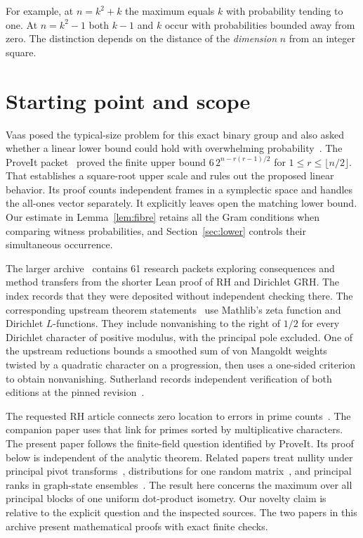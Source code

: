 \documentclass[11pt]{article}
\theoremstyle{remark}\newtheorem*{remark}{Remark}
\begin{document}
For example, at $n=k^2+k$ the maximum equals $k$ with probability tending to one. At $n=k^2-1$ both $k-1$ and $k$ occur with probabilities bounded away from zero. The distinction depends on the distance of the \emph{dimension} $n$ from an integer square.

\section{Starting point and scope}
Vaas posed the typical-size problem for this exact binary group and also asked whether a linear lower bound could hold with overwhelming probability~\cite{vaas}. The ProveIt packet~\cite{prev} proved the finite upper bound $6\,2^{n-r(r-1)/2}$ for $1\le r\le\lfloor n/2\rfloor$. That establishes a square-root upper scale and rules out the proposed linear behavior. Its proof counts independent frames in a symplectic space and handles the all-ones vector separately. It explicitly leaves open the matching lower bound. Our estimate in Lemma~\ref{lem:fibre} retains all the Gram conditions when comparing witness probabilities, and Section~\ref{sec:lower} controls their simultaneous occurrence.

The larger archive~\cite{catalog} contains 61 research packets exploring consequences and method transfers from the shorter Lean proof of RH and Dirichlet GRH. The index records that they were deposited without independent checking there. The corresponding upstream theorem statements~\cite{lean} use Mathlib's zeta function and Dirichlet $L$-functions. They include nonvanishing to the right of $1/2$ for every Dirichlet character of positive modulus, with the principal pole excluded. One of the upstream reductions bounds a smoothed sum of von Mangoldt weights twisted by a quadratic character on a progression, then uses a one-sided criterion to obtain nonvanishing. Sutherland records independent verification of both editions at the pinned revision~\cite{suth}.

The requested RH article connects zero location to errors in prime counts~\cite{wiki}. The companion paper uses that link for primes sorted by multiplicative characters. The present paper follows the finite-field question identified by ProveIt. Its proof below is independent of the analytic theorem. Related papers treat nullity under principal pivot transforms~\cite{pivot}, distributions for one random matrix~\cite{rank}, and principal ranks in graph-state ensembles~\cite{graph}. The result here concerns the maximum over all principal blocks of one uniform dot-product isometry. Our novelty claim is relative to the explicit question and the inspected sources. The two papers in this archive present mathematical proofs with exact finite checks.
\end{document}
